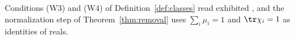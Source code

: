 
Conditions (W3) and (W4) of Definition~\ref{def:classes} read exhibited
, and the normalization step of Theorem~\ref{thm:removal}
uses $\sum_i\mu_i=1$ and $\tr\chi_i=1$ as identities of reals.

